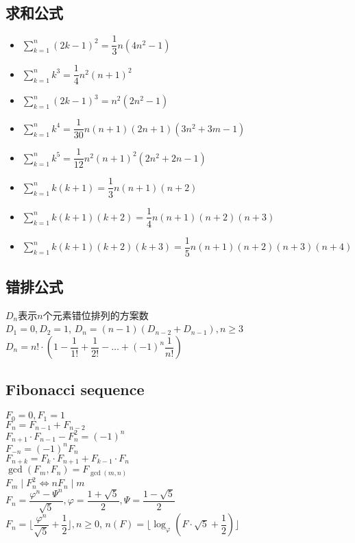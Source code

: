 \subsection*{求和公式}
    \begin{itemize}[wide=0pt]
        \item $ \sum\limits_{k=1}^{n} (2k - 1)^2 = \dfrac{1}{3} n(4n^2 - 1) $
        \item $ \sum\limits_{k=1}^{n} k^3 = \dfrac{1}{4} n^2(n + 1)^2 $
        \item $ \sum\limits_{k=1}^{n} (2k - 1)^3 = n^2(2n^2 - 1) $
        \item $ \sum\limits_{k=1}^{n} k^4 = \dfrac{1}{30} n(n + 1) (2n + 1) (3n^2 + 3m - 1) $
        \item $ \sum\limits_{k=1}^{n} k^5 = \dfrac{1}{12} n^2(n + 1)^2(2n^2 + 2n - 1) $
        \item $ \sum\limits_{k=1}^{n} k(k + 1) = \dfrac{1}{3} n(n + 1)(n + 2) $
        \item $ \sum\limits_{k=1}^{n} k(k + 1)(k + 2) = \dfrac{1}{4} n(n + 1)(n + 2)(n + 3) $
        \item $ \sum\limits_{k=1}^{n} k(k + 1)(k + 2)(k + 3) = \dfrac{1}{5} n(n + 1)(n + 2)(n + 3)(n + 4) $
    \end{itemize}

\subsection*{错排公式}
    $ D_n $表示$ n $个元素错位排列的方案数
    \\$ D_1 = 0, D_2 = 1 $, $ D_n = (n - 1)(D_{n - 2} + D_{n - 1}), n \geq 3 $
    \\$ D_n = n! \cdot (1 - \dfrac{1}{1!} + \dfrac{1}{2!} - \dots + (-1)^n\dfrac{1}{n!}) $

\subsection*{Fibonacci sequence}
    \noindent$ F_0 = 0, F_1 = 1 $
    \\$ F_n = F_{n - 1} + F_{n - 2} $
    \\$ F_{n + 1} \cdot F_{n - 1} - F_{n}^2 = (-1)^n $
    \\$ F_{-n} = (-1)^n F_n $
    \\$ F_{n + k} = F_k \cdot F_{n + 1} + F_{k - 1} \cdot F_n $
    \\$ \gcd(F_m, F_n) = F_{\gcd(m, n)} $
    \\$ F_m \mid F_n^2 \Leftrightarrow nF_n \mid m $
    \\$ F_n = \dfrac{\varphi^n - \varPsi^n}{\sqrt{5}}, \varphi = \dfrac{1 + \sqrt{5}}{2}, \varPsi = \dfrac{1 - \sqrt{5}}{2} $
    \\$ F_n = \lfloor \dfrac{\varphi^n}{\sqrt{5}} + \dfrac{1}{2} \rfloor, n \geq 0 $, $ n(F) = \lfloor \log_\varphi(F \cdot \sqrt{5} + \dfrac{1}{2}) \rfloor $

